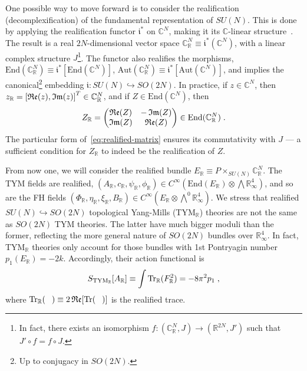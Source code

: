 \documentclass[../main.tex]{subfiles}
\begin{document}
One possible way to move forward is to consider the realification (decomplexification) of the fundamental representation of $SU(N)$. This is done by applying the realification functor $\mathfrak{i}^*$ on $\mathbb{C}^N$, making it  its $\mathbb{C}$-linear structure~\cite{kostrikin1989a,budinich1988a}. The result is a real $2N$-dimensional vector space $ \mathbb{C}^N_{\mathbb{R}} \equiv \mathfrak{i}^* (\mathbb{C}^N) $, with a linear complex structure $J$\footnote{In fact, there exists an isomorphism $f: (\mathbb{C}^{N}_{\mathbb{R}}, J) \rightarrow (\mathbb{R}^{2N},J')$ such that $J' \circ f = f \circ J$.}. The functor also realifies the morphisms, $ \mathrm{End} ( {\mathbb{C}}^N_{\mathbb{R}} ) \equiv \mathfrak{i}^* [ \mathrm{End} ( {\mathbb{C}}^N ) ] $, $ \mathrm{Aut} ( {\mathbb{C}}^N_{\mathbb{R}} ) \equiv \mathfrak{i}^* [ \mathrm{Aut}( {\mathbb{C}}^N ) ] $, and implies the canonical\footnote{Up to conjugacy in $SO(2N)$.} embedding $ \mathfrak{i}: SU(N) \hookrightarrow SO(2N)$. In practice, if $z \in \mathbb{C}^N$, then $z_{\mathbb{R}} = {[ \operatorname{\mathfrak{Re}} (z), \operatorname{\mathfrak{Im}} (z) ]}^T \in \mathbb{C}^N_\mathbb{R}$, and if $Z \in \mathrm{End}(\mathbb{C}^N)$, then
\begin{equation}%
  \label{eq:realified-matrix}
  Z_{\mathbb{R}} = \begin{pmatrix} \re (Z) & -\im (Z) \\ \im (Z) & \re (Z) \end{pmatrix} \in \mathrm{End}(\mathbb{C}^N_\mathbb{R}) \;.
\end{equation}
The particular form of~\eqref{eq:realified-matrix} ensures its commutativity with $J$ --- a sufficient condition for $Z_{\mathbb{R}}$ to indeed be the realification of $Z$.

From now one, we will consider the realified bundle $E_{\mathbb{R}} \equiv P \times_{SU(N)} \mathbb{C}^{N}_\mathbb{R}$. The TYM fields are realified, $(A_{\mathbb{R}}, c_{\mathbb{R}}, \psi_{\mathbb{R}}, \phi_{\mathbb{R}}) \in C^{\infty}(\mathrm{End}(E_{\mathbb{R}}) \otimes \bigwedge \mathbb{R}^4_{\infty} )$, and so are the FH fields $(\Phi_{\mathbb{R}}, \eta_{\mathbb{R}}, \xi_{\mathbb{R}}, B_{\mathbb{R}}) \in C^{\infty}(E_{\mathbb{R}} \otimes \bigwedge^0 \mathbb{R}^4_{\infty} )$. We stress that realified $SU(N) \hookrightarrow SO(2N)$ topological Yang-Mills (TYM$_{\mathbb{R}}$) theories are not the same as $SO(2N)$ TYM theories. The latter have much bigger moduli than the former, reflecting the more general nature of $SO(2N)$ bundles over $\mathbb{R}^4_{\infty}$. In fact, TYM$_{\mathbb{R}}$ theories only account for those bundles with 1st Pontryagin number $p_1 (E_{\mathbb{R}}) = -2 k$. Accordingly, their action functional is
\begin{equation}%
  \label{eq:real-tym-action}
  S_{\text{TYM}_{\mathbb{R}}} [A_{\mathbb{R}}] \equiv \int \tr_{\mathbb{R}} (F_{\mathbb{R}}^2) = - 8 \pi^2 p_1 \;,
\end{equation}
where $\operatorname{Tr}_{\mathbb{R}} (\hphantom{F}) \equiv 2\operatorname{\mathfrak{Re}} [ \operatorname{Tr} (\hphantom{F}) ] $ is the realified trace.
\end{document}
